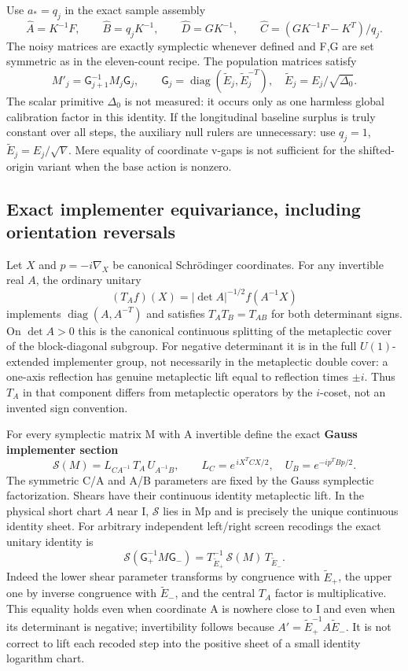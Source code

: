 \documentclass[11pt]{article}
\begin{document}
Use \(a_*=q_j\) in the exact sample assembly
\[
 \widehat A=K^{-1}F,\qquad \widehat B=q_jK^{-1},\qquad
 \widehat D=GK^{-1},\qquad
 \widehat C=(GK^{-1}F-K^T)/q_j .
\]
The noisy matrices are exactly symplectic whenever defined and F,G are set symmetric as in the eleven-count recipe. The population matrices satisfy
\[
 M'_j=\mathsf G_{j+1}^{-1}M_j\mathsf G_j,\qquad
 \mathsf G_j=\operatorname{diag}(\widetilde E_j,\widetilde E_j^{-T}),\quad
 \widetilde E_j=E_j/\sqrt{\Delta_0}.
\]
The scalar primitive \(\Delta_0\) is not measured: it occurs only as one harmless global calibration factor in this identity. If the longitudinal baseline surplus is truly constant over all steps, the auxiliary null rulers are unnecessary: use \(q_j=1\), \(\widetilde E_j=E_j/\sqrt V\). Mere equality of coordinate v-gaps is not sufficient for the shifted-origin variant when the base action is nonzero.

\subsection{Exact implementer equivariance, including orientation reversals}\label{exact-implementer-equivariance-including-orientation-reversals}

Let \(X\) and \(p=-i\nabla_X\) be canonical Schrödinger coordinates. For any invertible real \(A\), the ordinary unitary
\[
 (T_Af)(X)=|\det A|^{-1/2}f(A^{-1}X)
\]
implements \(\operatorname{diag}(A,A^{-T})\) and satisfies \(T_AT_B=T_{AB}\) for both determinant signs. On \(\det A>0\) this is the canonical continuous splitting of the metaplectic cover of the block-diagonal subgroup. For negative determinant it is in the full \(U(1)\)-extended implementer group, not necessarily in the metaplectic double cover: a one-axis reflection has genuine metaplectic lift equal to reflection times \(\pm i\). Thus \(T_A\) in that component differs from metaplectic operators by the \(i\)-coset, not an invented sign convention.

For every symplectic matrix M with A invertible define the exact \textbf{Gauss implementer section}
\[
 \mathcal S(M)=L_{CA^{-1}}\,T_A\,U_{A^{-1}B},\qquad
 L_C=e^{\,i X^T C X/2},\quad U_B=e^{-i p^T Bp/2}.
\]
The symmetric C/A and A/B parameters are fixed by the Gauss symplectic factorization. Shears have their continuous identity metaplectic lift. In the physical short chart \(A\) near I, \(\mathcal S\) lies in Mp and is precisely the unique continuous identity sheet. For arbitrary independent left/right screen recodings the exact unitary identity is
\[
 \mathcal S\!\left(\mathsf G_+^{-1}M\mathsf G_-\right)
     =T_{\widetilde E_+}^{-1}\,\mathcal S(M)\,T_{\widetilde E_-}.
\]
Indeed the lower shear parameter transforms by congruence with \(\widetilde E_+\), the upper one by inverse congruence with \(\widetilde E_-\), and the central \(T_A\) factor is multiplicative. This equality holds even when coordinate A is nowhere close to I and even when its determinant is negative; invertibility follows because \(A'=\widetilde E_+^{-1}A\widetilde E_-\). It is not correct to lift each recoded step into the positive sheet of a small identity logarithm chart.
\end{document}
